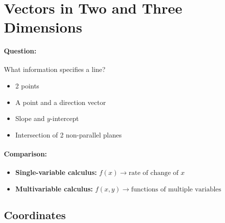 \section{Vectors in Two and Three Dimensions}

\paragraph{Question:} What information specifies a line?
\begin{itemize}
    \item 2 points
    \item A point and a direction vector
    \item Slope and $y$-intercept
    \item Intersection of 2 non-parallel planes
\end{itemize}

\paragraph{Comparison:}
\begin{itemize}
    \item \textbf{Single-variable calculus:} $f(x) \rightarrow \text{rate of change of } x$
    \item \textbf{Multivariable calculus:} $f(x,y) \rightarrow \text{functions of multiple variables}$
\end{itemize}


\subsection{Coordinates}

